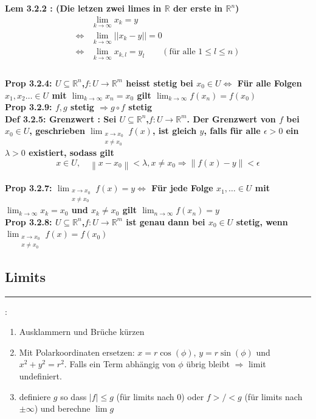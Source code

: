 \documentclass[7pt,landscape, margin = 0.1mm]{article}
\newcommand*{\mysubsection}[1]{\vspace{-2mm}\color{chaptercolor}\subsection{ #1 }
\vspace{-1mm}\hrule\vspace{1.5mm}\color{black}
\vspace{2mm}}
\newcommand{\KRZ}[2]{\vspace{1mm} \hline \vspace{1mm} \color{chaptercolor}{RC #1}:\color{black} \   \hspace{0.2cm}\vspace{1mm}   {\begin{minipage}{20em}
#2 \end{minipage}} \vspace{1mm}  \hline \vspace{1mm}  \\}
\newcommand{\DEF}[2]{\color{chaptercolor}\bf{Def #1}:\color{black}    \hspace{0.2cm} #2 \\}
\newcommand{\PROP}[2]{\color{chaptercolor}\bf{Prop #1}:\color{black}    \hspace{0.2cm} #2 \\}
\newcommand{\LEM}[2]{\color{chaptercolor}\bf{Lem #1}:\color{black}    \hspace{0.2cm} #2 \\}
\begin{document}
\begin{multicols}{4}
\begin{flushleft}
\LEM{3.2.2 }{
(Die letzen zwei limes in $\mathbb{R}$ der erste in $\mathbb{R}^n$)
\begin{align*}
&\lim_{k \to \infty } x_{k}=y\\
 \iff &\lim_{k \to \infty } ||x_{k}-y||=0\\
 \iff &\lim_{k \to \infty } x_{k,l}=y_{l} \qquad (\text{für alle }1 \leq l \leq n)\\
 \end{align*}}
 
 \PROP{3.2.4}{$U \subseteq \mathbb{R}^{n}$,$f:U \to \mathbb{R}^{m}$ heisst stetig bei $x_{0}\in U \Leftrightarrow$ Für alle Folgen $x_{1},x_{2}\ldots  \in U$ mit $\lim_{k \to \infty}x_{n}=x_{0}$ gilt $\lim_{k \to \infty} f(x_{n})=f(x_{0})$}
 
 \PROP{3.2.9}{$f,g$ stetig $\Rightarrow g \circ f$ stetig}
 
 
\DEF{3.2.5: Grenzwert }{Sei $U \subseteq \mathbb{R}^n$,$f:U\to \mathbb{R}^m$. Der Grenzwert von $f$ bei $x_{0}\in U$, geschrieben  $\displaystyle \lim_{\substack{x\to x_{0}\\ x \neq x_{0}}} f(x)$, ist gleich $y$, falls für alle $\epsilon > 0$ ein $\lambda >0$ existiert, sodass gilt 
  $$
 x\in U , \quad \left\|x - x_{0} \right\|< \lambda , x \neq x_{0}\Rightarrow \left\|f(x)-y \right\| < \epsilon
 $$}

\PROP{3.2.7}{$\displaystyle \lim_{\substack{x\to x_{0}\\ x \neq x_{0}}} f(x)=y \Leftrightarrow$ Für jede Folge $x_{1}, \ldots \in U$ mit $\lim_{k \to \infty} x_{k}= x_{0}$ und $x_{k}\neq x_0$ gilt $\lim_{n\to \infty} f(x_n)=y$ }

\PROP{3.2.8}{$U \subseteq \mathbb{R}^n$,$f:U\to \mathbb{R}^m$ ist genau dann bei $x_{0} \in U$ stetig, wenn $\displaystyle \lim_{\substack{x\to x_{0}\\ x \neq x_{0}}} f(x)=f(x_0)$}

\mysubsection{Limits}

\KRZ{}{
\begin{enumerate}
\item Ausklammern und Brüche kürzen
\item Mit Polarkoordinaten ersetzen: $x=r\cos(\phi)$, $y=r\sin(\phi)$ und $x^2 +y^2 =r^2$. Falls ein Term abhängig von $\phi$ übrig bleibt $\Rightarrow$ limit undefiniert.
\item definiere $g$ so dass $|f|\leq g$ (für limits nach $0$) oder $f>/< g$ (für limits nach $\pm \infty$) und berechne $\lim g$

\end{enumerate}

}
\end{flushleft}
\end{multicols}
\end{document}
